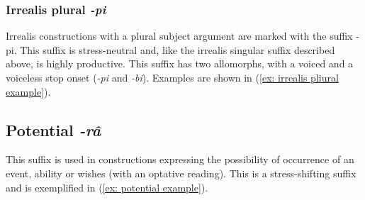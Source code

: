 \subsubsection{Irrealis plural \textit{-pi}}
\label{subsubsec: irrealis plural}

Irrealis constructions with a plural subject argument are marked with the suffix -pi. This suffix is stress-neutral and, like the irrealis singular suffix described above, is highly productive. This suffix has two allomorphs, with a voiced and a voiceless stop onset (\textit{-pi} and \textit{-bi}). Examples are shown in (\ref{ex: irrealis pliural example}).

\ea\label{ex: irrealis pliural example}

    \z
\z

\subsection{Potential \textit{-râ}}
\label{subsec: potential}

This suffix is used in constructions expressing the possibility of occurrence of an event, ability or wishes (with an optative reading). This is a stress-shifting suffix and is exemplified in (\ref{ex: potential example}).


\ea\label{ex: potential example}

